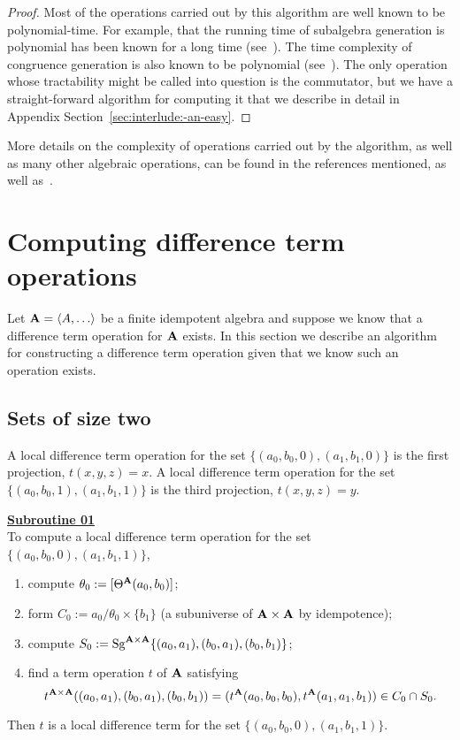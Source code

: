 \begin{proof}
    Most of the operations carried out by this algorithm are well known to be
    polynomial-time.  For example, that the running time of subalgebra generation is
    polynomial has been known for a long time (see~\cite{MR0455543}).
    The time complexity of congruence generation is also known to be polynomial
    (see~\cite{MR2470585}).  The only operation whose tractability might be
    called into question is the commutator, but we have a straight-forward
    algorithm for computing it that we describe in detail in
    Appendix Section~\ref{sec:interlude:-an-easy}.
\end{proof}


More details on the complexity of operations carried out by the algorithm, as well as many other algebraic operations, can be found in the references mentioned, as well as~\cite{MR1871085,MR1695293,Freese:2009}.

\section{Computing difference term operations}
Let $\alg{A} = \<A, \dots\>$ be a finite idempotent algebra and suppose we know that
a difference term operation for $\mathbf{A}$ exists.  In this section we
describe an algorithm for constructing a difference term operation given
that we know such an operation exists.

\subsection{Sets of size two}
A local difference term operation for the set
$\{(a_0,b_0,0), (a_1, b_1, 0)\}$ is the first projection,
$t(x,y,z) = x$.
A local difference term operation for the set
$\{(a_0,b_0,1), (a_1, b_1, 1)\}$ is the third projection,
$t(x,y,z) = y$.


\smallskip

\noindent \underline{\textbf{Subroutine 01}}\\[4pt]
To compute a local difference term operation for the set
$\{(a_0,b_0,0), (a_1, b_1, 1)\}$,
\begin{enumerate}
\item compute $\theta_0:=[\Theta^{\mathbf{A}}(a_0, b_0)]$;
\item form $C_0:= a_0/\theta_0 \times \{b_1\}$
      (a subuniverse of $\mathbf{A}\times\mathbf{A}$ by idempotence);
\item compute
      $S_0:=\operatorname{Sg}^{\mathbf{A}\times \mathbf{A}} \{(a_0,a_1),(b_0,a_1),(b_0,b_1)\}$;
\item find a term operation $t$ of $\mathbf{A}$ satisfying
\[t^{\mathbf{A}\times\mathbf{A}}((a_0,a_1),(b_0,a_1),(b_0,b_1)) =
 (t^{\mathbf{A}}(a_0,b_0,b_0), t^{\mathbf{A}}(a_1,a_1,b_1)) \in C_0 \cap S_0.\]
\end{enumerate}
Then $t$ is a local difference term for the set
$\{(a_0, b_0, 0), (a_1, b_1, 1)\}$.

